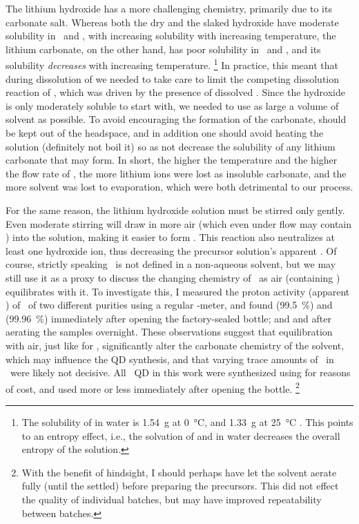 \documentclass[webedition,openright,titles,swedish,english]{LuaUUThesis}\usepackage[]{graphicx}\usepackage[]{xcolor}
\newcommand{\ie}{i.e.}
\begin{document}
The lithium hydroxide  has a more
challenging chemistry, primarily due to its carbonate salt.
Whereas both the dry and the slaked hydroxide have moderate solubility in \water\ and \EtOH,
with increasing solubility with increasing temperature, the
lithium carbonate, on the other hand, has poor solubility in \water\ and \EtOH,
and its solubility \emph{decreases} with increasing temperature.%
\footnote{%
   The solubility of  in water is \qty{1.54}{\gram} at \qty{0}{\celsius},
   and \qty{1.33}{\gram} at \qty{25}{\celsius} \cite{CRC104}.
   This points to an entropy effect, \ie, the solvation of  and 
   in water decreases the overall entropy of the solution.}
In practice, this meant that during dissolution of
 we needed
to take care to limit the competing dissolution reaction of , which was
driven by the presence of dissolved .
Since the hydroxide is only moderately soluble to start with, we needed to use
as large a volume of solvent as possible. To avoid encouraging the formation
of the carbonate,  should be kept out of the headspace, and in addition
one should avoid heating the solution (definitely not boil it) so as not decrease
the solubility of any lithium carbonate that may form.
In short, the higher the temperature and the higher the flow rate of ,
the more lithium ions were lost as insoluble carbonate, and
the more solvent was lost to evaporation, which were both detrimental to our process.

For the same reason, the lithium hydroxide solution  must be stirred only gently.
Even moderate stirring will draw in more air (which even under  flow may contain
) into the solution, making it easier to form .
This reaction also neutralizes at least one hydroxide ion, thus decreasing the
precursor solution's apparent \pH.
Of course, strictly speaking \pH\ is not defined in a non-aqueous solvent,
but we may still use it as a proxy to discuss the changing chemistry of \EtOH\ as
air (containing \carbondiox) equilibrates with it.
To investigate this, I measured the proton activity (apparent \pH) of \EtOH\ of
two different purities using a regular \pH-meter,
and found  (\qty{99.5}{\percent}) and  (\qty{99.96}{\percent})
immediately after opening the factory-sealed bottle;
and  and  after aerating the samples overnight.
These observations suggest that equilibration with air, just like for \water, significantly
alter the carbonate chemistry of the solvent, which may influence the \gls{QD} synthesis,
and that varying trace amounts of \water\ in \EtOH\ were likely not decisive.
All \ZnO\ \gls{QD} in this work were synthesized using 
for reasons of cost, and used more or less immediately after opening the bottle.%
\footnote{%
   With the benefit of hindsight, I should perhaps have let the 
   solvent aerate fully (until the \pH{} settled) before preparing the precursors.
   This did not effect the quality of individual batches, but may have improved
   repeatability between batches.}
\end{document}
